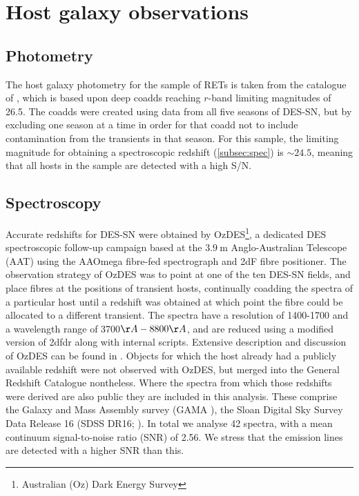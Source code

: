\documentclass[fleqn,usenatbib,]{mnras}
\begin{document}
\section{Host galaxy observations \label{sec:obs}}
\subsection{Photometry \label{subsec:phot}}

The host galaxy photometry for the sample of RETs is taken from the catalogue of \citet{Wiseman2020}, which is based upon deep coadds reaching $r$-band limiting magnitudes of 26.5. The coadds were created using data from all five seasons of DES-SN, but by excluding one season at a time in order for that coadd not to include contamination from the transients in that season. For this sample, the limiting magnitude for obtaining a spectroscopic redshift (\ref{subsec:spec}) is $\sim 24.5$, meaning that all hosts in the sample are detected with a high S/N.

\subsection{Spectroscopy \label{subsec:spec}}
Accurate redshifts for DES-SN were obtained by OzDES\footnote{Australian (Oz) Dark Energy Survey}, a dedicated DES spectroscopic follow-up campaign based at the $3.9~\textrm{m}$ Anglo-Australian Telescope (AAT) using the AAOmega fibre-fed spectrograph and 2dF fibre positioner. The observation strategy of OzDES was to point at one of the ten DES-SN fields, and place fibres at the positions of transient hosts, continually coadding the spectra of a particular host until a redshift was obtained at which point the fibre could be allocated to a different transient. The spectra have a resolution of 1400-1700 and a wavelength range of 3700$\AA - 8800\AA$, and are reduced using a modified version of 2dfdr \citep{Croom2004} along with internal scripts. Extensive description and discussion of OzDES can be found in \citet{Yuan2015,Childress2017,Lidman2020}.
Objects for which the host already had a publicly available redshift were not observed with OzDES, but merged into the General Redshift Catalogue nontheless. Where the spectra from which those redshifts were derived are also public they are included in this analysis. These comprise the Galaxy and Mass Assembly survey (GAMA \citealt{Driver2009,Baldry2018}), the Sloan Digital Sky Survey Data Release 16 (SDSS DR16; \citealt{Ahumada2019}). In total we analyse 42 spectra, with a mean continuum signal-to-noise ratio (SNR) of 2.56. We stress that the emission lines are detected with a higher SNR than this.
\end{document}
